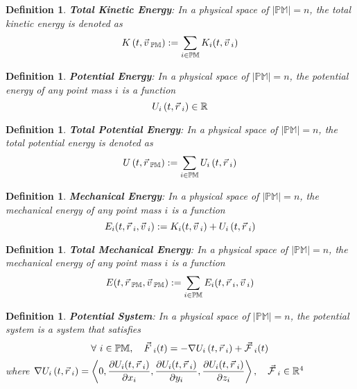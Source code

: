 \documentclass[12pt]{amsart}
\newtheorem{definition}[theorem]{Definition}
\let\oldvec\vec
\renewcommand{\vec}[1]{\oldvec{#1}\hspace{0.1em}}
\begin{document}
\begin{definition}
    \textbf{Total Kinetic Energy}: In a physical space of $\left | \mathbb{PM} \right | = n$, the total kinetic energy is denoted as $$K \left ( t, \vec{v}_\mathbb{PM} \right ) := \sum_{i \in \mathbb{PM}}  K_i(t, \vec{v}_i) $$
\end{definition}

\begin{definition}
    \textbf{Potential Energy}: In a physical space of $\left | \mathbb{PM} \right | = n$, the potential energy of any point mass $i$ is a function $$  U_i \left ( t, \vec{r}_i \right ) \in \mathbb{R} $$
\end{definition}

\begin{definition}
    \textbf{Total Potential Energy}: In a physical space of $\left | \mathbb{PM} \right | = n$, the total potential energy is denoted as $$U\left ( t, \vec{r}_\mathbb{PM} \right ) := \sum_{i \in \mathbb{PM}}  U_i \left ( t, \vec{r}_i \right )  $$
\end{definition}

\begin{definition}
    \textbf{Mechanical Energy}: In a physical space of $\left | \mathbb{PM} \right | = n$, the mechanical energy of any point mass $i$ is a function $$E_i(t, \vec{r}_i, \vec{v}_i) := K_i (t, \vec{v}_i) +  U_i \left ( t, \vec{r}_i \right )$$
\end{definition}

\begin{definition}
    \textbf{Total Mechanical Energy}: In a physical space of $\left | \mathbb{PM} \right | = n$, the mechanical energy of any point mass $i$ is a function $$E(t, \vec{r}_\mathbb{PM}, \vec{v}_\mathbb{PM}) := \sum_{i \in \mathbb{PM}} E_i(t, \vec{r}_i, \vec{v}_i)$$
\end{definition}

\begin{definition}
    \textbf{Potential System}: In a physical space of $\left | \mathbb{PM} \right | = n$, the potential system is a system that satisfies $$\forall \  i \in \mathbb{PM}, \quad \vec{F}_i (t) = - \nabla U_i \left ( t, \vec{r}_i  \right) + \vec{\mathcal{F}}_i(t) $$ where $ \nabla  U_i \left ( t, \vec{r}_i \right )  = \left < 0, \dfrac{\partial U_i (t, \vec{r}_i)}{\partial x_i}, \dfrac{\partial U_i (t, \vec{r}_i)}{\partial y_i}, \dfrac{\partial U_i (t, \vec{r}_i)}{\partial z_i} \right >, \quad \vec{\mathcal{F}}_i \in \mathbb{R}^4 $
\end{definition}
\end{document}
